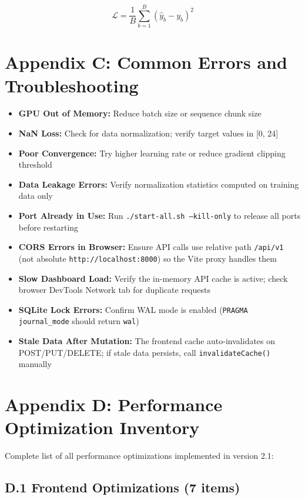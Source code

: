 \documentclass[12pt]{article}
\begin{document}
	\begin{equation}
	\mathcal{L} = \frac{1}{B} \sum_{b=1}^{B} (\hat{y}_b - y_b)^2
	\end{equation}

	\section*{Appendix C: Common Errors and Troubleshooting}

	\begin{itemize}
		\item \textbf{GPU Out of Memory:} Reduce batch size or sequence chunk size
		\item \textbf{NaN Loss:} Check for data normalization; verify target values in [0, 24]
		\item \textbf{Poor Convergence:} Try higher learning rate or reduce gradient clipping threshold
		\item \textbf{Data Leakage Errors:} Verify normalization statistics computed on training data only
		\item \textbf{Port Already in Use:} Run \texttt{./start-all.sh --kill-only} to release all ports before restarting
		\item \textbf{CORS Errors in Browser:} Ensure API calls use relative path \texttt{/api/v1} (not absolute \texttt{http://localhost:8000}) so the Vite proxy handles them
		\item \textbf{Slow Dashboard Load:} Verify the in-memory API cache is active; check browser DevTools Network tab for duplicate requests
		\item \textbf{SQLite Lock Errors:} Confirm WAL mode is enabled (\texttt{PRAGMA journal\_mode} should return \texttt{wal})
		\item \textbf{Stale Data After Mutation:} The frontend cache auto-invalidates on POST/PUT/DELETE; if stale data persists, call \texttt{invalidateCache()} manually
	\end{itemize}

	\section*{Appendix D: Performance Optimization Inventory}

	Complete list of all performance optimizations implemented in version 2.1:

	\subsection*{D.1 Frontend Optimizations (7 items)}
\end{document}
